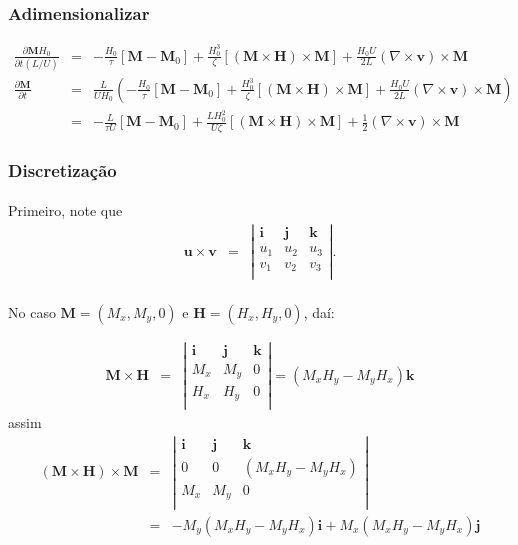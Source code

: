 \documentclass[eletromagnetismo.tex]{subfiles}
\begin{document}
\subsubsection{Adimensionalizar}
\begin{eqnarray}
\frac{\partial \mathbf{M} H_0}{\partial t(L/U)} &=& -\frac{H_0}{\tau}[\mathbf{M} - \mathbf{M}_0]+\frac{H_0^3}{\zeta}[(\mathbf{M}\times \mathbf{H})\times\mathbf{M}]+\frac{H_0 U}{2L}(\nabla\times \mathbf{v})\times \mathbf{M}\\
\frac{\partial \mathbf{M}}{\partial t} &=& \frac{L}{U H_0}\left(-\frac{H_0}{\tau}[\mathbf{M} - \mathbf{M}_0]+\frac{H_0^3}{\zeta}[(\mathbf{M}\times \mathbf{H})\times\mathbf{M}]+\frac{H_0 U}{2L}(\nabla\times \mathbf{v})\times \mathbf{M}\right)\\
&=&-\frac{L}{\tau U}[\mathbf{M} - \mathbf{M}_0]+\frac{L H_0^2}{U\zeta}[(\mathbf{M}\times \mathbf{H})\times\mathbf{M}]+\frac{1}{2}(\nabla\times \mathbf{v})\times \mathbf{M}
\end{eqnarray}

\subsubsection{Discretização}
\paragraph{} Primeiro, note que \begin{eqnarray}
	\mathbf{u}\times \mathbf{v} & = & \left| \begin{array}{ccc}
 	\mathbf{i} & \mathbf{j} & \mathbf{k}\\
 	u_1 & u_2 & u_3\\
 	v_1 & v_2 & v_3\\
 \end{array}
 \right|.
\end{eqnarray}
\paragraph{} No caso $\mathbf{M}=(M_x, M_y, 0)$ e $\mathbf{H}=(H_x, H_y, 0)$, daí:

\begin{eqnarray}
	\mathbf{M}\times \mathbf{H} & = & \left| \begin{array}{ccc}
 	\mathbf{i} & \mathbf{j} & \mathbf{k}\\
 	M_x & M_y & 0\\
 	H_x & H_y & 0\\
 \end{array}
 \right| = (M_x H_y - M_y H_x)\mathbf{k}
\end{eqnarray}
assim
\begin{eqnarray}
(\mathbf{M}\times \mathbf{H})\times \mathbf{M} & = & \left| \begin{array}{ccc}
 	\mathbf{i} & \mathbf{j} & \mathbf{k}\\
 	0 & 0 & (M_x H_y - M_y H_x)\\
 	M_x & M_y & 0\\
 \end{array}
 \right|\\ 
 &=& -M_y(M_x H_y - M_y H_x)\mathbf{i}+M_x(M_x H_y - M_y H_x)\mathbf{j}
\end{eqnarray}
\end{document}
